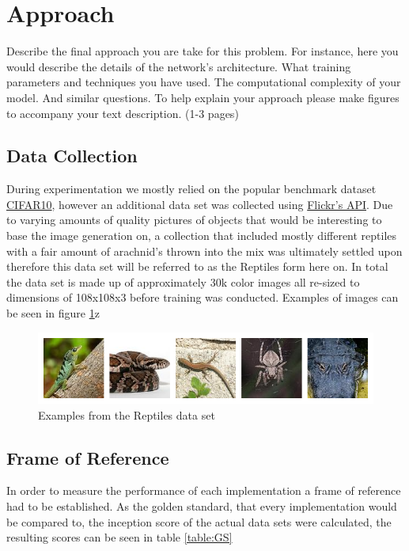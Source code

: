 
\section{Approach}

Describe the final approach you are take for this problem.
For instance, here you would describe the details of the network’s
architecture. What training parameters and techniques you have used.
The computational complexity of your model. And similar questions.
To help explain your approach please make figures to accompany your
text description. (1-3 pages)

\subsection{Data Collection}
During experimentation we mostly relied on the popular benchmark dataset \href{https://www.cs.toronto.edu/~kriz/cifar.html}{CIFAR10}, however an additional data set was collected using \href{https://www.flickr.com/services/api/}{Flickr's API}. Due to varying amounts of quality pictures of objects that would be interesting to base the image generation on, a collection that included mostly different reptiles with a fair amount of arachnid's thrown into the mix was ultimately settled upon therefore this data set will be referred to as the Reptiles form here on. In total the data set is made up of approximately 30k color images all re-sized to dimensions of 108x108x3 before training was conducted. Examples of images can be seen in figure \ref{fig:reptiles}z

\begin{figure}[h]
\centering
\includegraphics[width=\textwidth]{figures/reptiles.png}
\caption{Examples from the Reptiles data set}
\label{fig:reptiles}
\end{figure}




\subsection{Frame of Reference}
In order to measure the performance of each implementation a frame of reference had to be established. As the golden standard, that every implementation would be compared to, the inception score of the actual data sets were calculated, the resulting scores can be seen in table \ref{table:GS}

